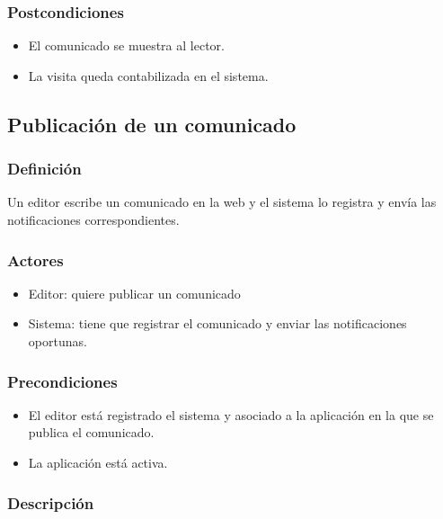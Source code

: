 \subsubsection*{Postcondiciones}
\begin{itemize}
    \item El comunicado se muestra al lector.
    \item La visita queda contabilizada en el sistema.
\end{itemize}


\subsection{Publicación de un comunicado}

\subsubsection*{Definición}
Un editor escribe un comunicado en la web y el sistema lo registra y envía las notificaciones correspondientes.

\subsubsection*{Actores}
\begin{itemize}
    \item Editor: quiere publicar un comunicado
    \item Sistema: tiene que registrar el comunicado y enviar las notificaciones oportunas.
\end{itemize}

\subsubsection*{Precondiciones}
\begin{itemize}
    \item El editor está registrado el sistema y asociado a la aplicación en la que se publica el comunicado.
    \item La aplicación está activa.
\end{itemize}

\subsubsection*{Descripción}

